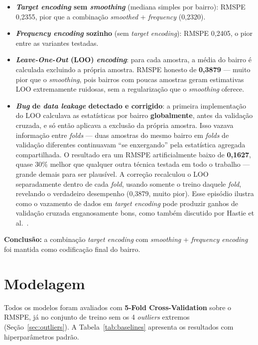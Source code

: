 \documentclass[12pt, a4paper]{article}
\begin{document}
\begin{itemize}[leftmargin=2em]
  \item \textbf{\textit{Target encoding} sem \textit{smoothing}} (mediana simples por bairro): RMSPE 0,2355, pior que a combinação \textit{smoothed} + \textit{frequency} (0,2320).
  \item \textbf{\textit{Frequency encoding} sozinho} (sem \textit{target encoding}): RMSPE 0,2405, o pior entre as variantes testadas.
  \item \textbf{\textit{Leave-One-Out} (LOO) \textit{encoding}}: para cada amostra, a média do bairro é calculada excluindo a própria amostra. RMSPE honesto de \textbf{0,3879} --- muito pior que o \textit{smoothing}, pois bairros com poucas amostras geram estimativas LOO extremamente ruidosas, sem a regularização que o \textit{smoothing} oferece.
  \item \textbf{\textit{Bug} de \textit{data leakage} detectado e corrigido}: a primeira implementação do LOO calculava as estatísticas por bairro \textbf{globalmente}, antes da validação cruzada, e só então aplicava a exclusão da própria amostra. Isso vazava informação entre \textit{folds} --- duas amostras do mesmo bairro em \textit{folds} de validação diferentes continuavam ``se enxergando'' pela estatística agregada compartilhada. O resultado era um RMSPE artificialmente baixo de \textbf{0,1627}, quase 30\% melhor que qualquer outra técnica testada em todo o trabalho --- grande demais para ser plausível. A correção recalculou o LOO separadamente dentro de cada \textit{fold}, usando somente o treino daquele \textit{fold}, revelando o verdadeiro desempenho (0,3879, muito pior). Esse episódio ilustra como o vazamento de dados em \textit{target encoding} pode produzir ganhos de validação cruzada enganosamente bons, como também discutido por Hastie et al.~\cite{ref:hastie}.
\end{itemize}

\textbf{Conclusão:} a combinação \textit{target encoding} com \textit{smoothing} + \textit{frequency encoding} foi mantida como codificação final do bairro.

\section{Modelagem}

Todos os modelos foram avaliados com \textbf{5-Fold Cross-Validation} sobre o RMSPE, já no conjunto de treino sem os 4 \textit{outliers} extremos (Seção~\ref{sec:outliers}). A Tabela~\ref{tab:baselines} apresenta os resultados com hiperparâmetros padrão.
\end{document}
